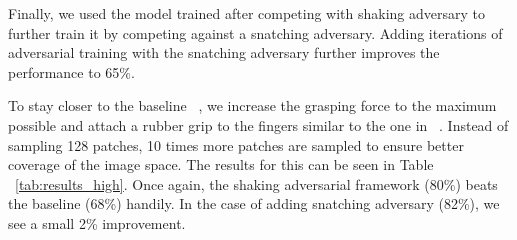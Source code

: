 \documentclass[letterpaper, 10 pt, conference]{ieeeconf}  %
\begin{document}
Finally, we used the model trained after competing with shaking adversary to further train it by competing against a snatching adversary. Adding iterations of adversarial training with the snatching adversary further improves the performance to 65\%.


To stay closer to the baseline ~\cite{pinto2016supersizing}, we increase the grasping force to the maximum possible and attach a rubber grip to the fingers similar to the one in ~\cite{pinto2016supersizing}. Instead of sampling 128 patches, 10 times more patches are sampled to ensure better coverage of the image space. The results for this can be seen in Table ~\ref{tab:results_high}. Once again, the shaking adversarial framework (80\%) beats the baseline (68\%) handily. In the case of adding snatching adversary (82\%), we see a small 2\% improvement.
\end{document}
